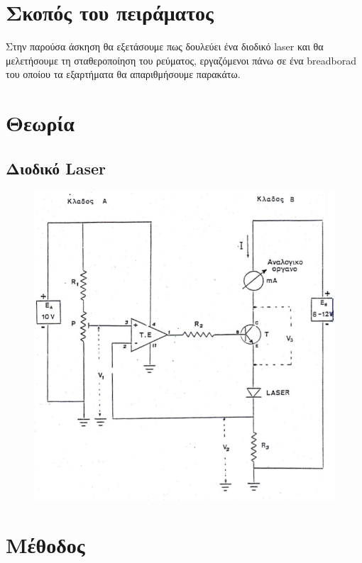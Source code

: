 \documentclass[a4paper,12pt,titlepage]{article}
\makeatletter
\def\maxwidth{
\ifdim\Gin@nat@width>\linewidth
\linewidth
\else
\Gin@nat@width
\fi
}
\makeatother
\begin{document}
\section{Σκοπός του πειράματος}

Στην παρούσα άσκηση θα εξετάσουμε πως δουλεύει ένα διοδικό laser και θα μελετήσουμε τη σταθεροποίηση του ρεύματος, εργαζόμενοι πάνω σε ένα breadborad του οποίου τα εξαρτήματα θα απαριθμήσουμε παρακάτω.

\section{Θεωρία}

\subsection*{Διοδικό Laser}

\begin{figure}[!h]
\centering
\includegraphics[width=\maxwidth]{diataksi.png}\\[0.3cm]
\end{figure}

\newpage

\section{Μέθοδος}
\end{document}
